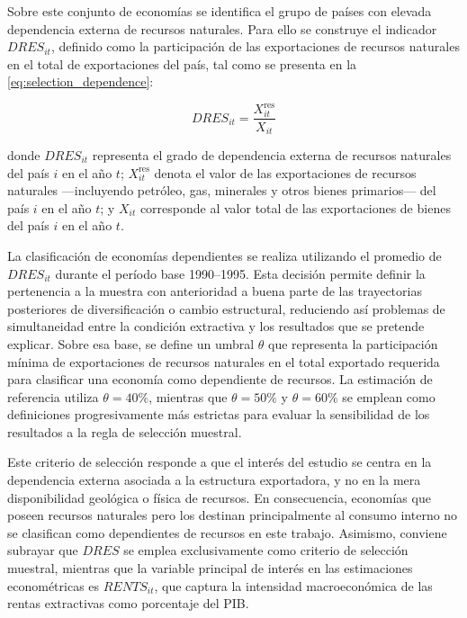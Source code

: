 \documentclass[../../PTFM.tex]{subfiles}
\begin{document}
	Sobre este conjunto de economías se identifica el grupo de países con
	elevada dependencia externa de recursos naturales. Para ello se construye
	el indicador $DRES_{it}$, definido como la participación de las
	exportaciones de recursos naturales en el total de exportaciones del
	país, tal como se presenta en la \autoref{eq:selection_dependence}:

	\begin{equation}
		DRES_{it} =
		\frac{X^{\text{res}}_{it}}{X_{it}}
		\label{eq:selection_dependence}
	\end{equation}

	donde $DRES_{it}$ representa el grado de dependencia externa de recursos
	naturales del país $i$ en el año $t$; $X^{\text{res}}_{it}$ denota el
	valor de las exportaciones de recursos naturales ---incluyendo petróleo,
	gas, minerales y otros bienes primarios--- del país $i$ en el año $t$; y
	$X_{it}$ corresponde al valor total de las exportaciones de bienes del
	país $i$ en el año $t$.

	La clasificación de economías dependientes se realiza utilizando el
	promedio de $DRES_{it}$ durante el período base 1990--1995. Esta decisión
	permite definir la pertenencia a la muestra con anterioridad a buena
	parte de las trayectorias posteriores de diversificación o cambio
	estructural, reduciendo así problemas de simultaneidad entre la
	condición extractiva y los resultados que se pretende explicar. Sobre esa
	base, se define un umbral $\theta$ que representa la participación mínima
	de exportaciones de recursos naturales en el total exportado requerida
	para clasificar una economía como dependiente de recursos. La estimación
	de referencia utiliza $\theta=40\%$, mientras que $\theta=50\%$ y
	$\theta=60\%$ se emplean como definiciones progresivamente más estrictas
	para evaluar la sensibilidad de los resultados a la regla de selección
	muestral.

	Este criterio de selección responde a que el interés del estudio se
	centra en la dependencia externa asociada a la estructura exportadora, y
	no en la mera disponibilidad geológica o física de recursos. En
	consecuencia, economías que poseen recursos naturales pero los destinan
	principalmente al consumo interno no se clasifican como dependientes de
	recursos en este trabajo. Asimismo, conviene subrayar que $DRES$ se
	emplea exclusivamente como criterio de selección muestral, mientras que
	la variable principal de interés en las estimaciones econométricas es
	$RENTS_{it}$, que captura la intensidad macroeconómica de las rentas
	extractivas como porcentaje del PIB.
\end{document}
